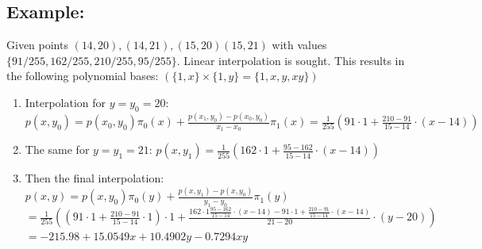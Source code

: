 \subsection{Example:}
Given points $(14,20),(14,21),(15,20)(15,21)$ with values $\{91/255, 162/255, 210/255, 95/255\}$. Linear interpolation is sought. 
This results in the following polynomial bases: $(\{1,x\}\times\{1,y\}=\{1,x,y,xy\})$\\
\begin{enumerate}
  \item Interpolation for $y=y_0=20$: $p(x,y_0)= p(x_0,y_0) \pi_0(x) + \frac{p(x_1,y_0)-p(x_0,y_0)}{x_1-x_0}\pi_1(x)=\frac{1}{255}\left(91 \cdot 1 + \frac{210-91}{15-14}\cdot(x-14)\right)$
  \item The same for $y=y_1=21$:  $p(x,y_1)=\frac{1}{255}\left(162 \cdot 1 + \frac{95-162}{15-14}\cdot(x-14)\right)$
  \item Then the final interpolation: $p(x,y)=p(x,y_0)\pi_0(y)+\frac{p(x,y_1)-p(x,y_0)}{y_1-y_0}\pi_1(y)$\\
  $=\frac 1{255} \left((91\cdot 1 +\frac{210-91}{15-14}\cdot 1)\cdot 1 + \frac{162\cdot 1 \frac{95-162}{15-14}\cdot (x-14)-91\cdot 1 + \frac{210-91}{15-14}\cdot(x-14)}{21-20}\cdot(y-20)\right)$
  $=-215.98 + 15.0549 x + 10.4902 y - 0.7294 x y$
\end{enumerate}
